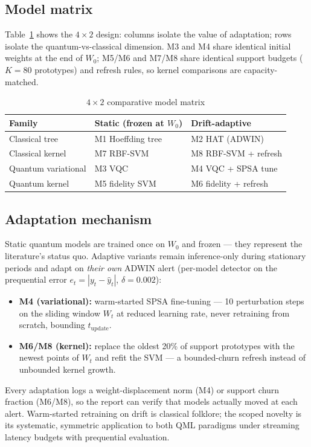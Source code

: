 \documentclass[conference]{IEEEtran}
\begin{document}
\subsection{Model matrix}
Table~\ref{tab:matrix} shows the $4 \times 2$ design: columns isolate the value of
adaptation; rows isolate the quantum-vs-classical dimension. M3 and M4 share identical
initial weights at the end of $W_0$; M5/M6 and M7/M8 share identical support budgets
($K = 80$ prototypes) and refresh rules, so kernel comparisons are capacity-matched.

\begin{table}[t]
\centering
\caption{$4 \times 2$ comparative model matrix}
\label{tab:matrix}
\footnotesize
\setlength{\tabcolsep}{4pt}
\begin{tabular}{@{}lll@{}}
\toprule
Family & Static (frozen at $W_0$) & Drift-adaptive \\
\midrule
Classical tree & M1 Hoeffding tree & M2 HAT (ADWIN) \\
Classical kernel & M7 RBF-SVM & M8 RBF-SVM + refresh \\
Quantum variational & M3 VQC & M4 VQC + SPSA tune \\
Quantum kernel & M5 fidelity SVM & M6 fidelity + refresh \\
\bottomrule
\end{tabular}
\end{table}

\subsection{Adaptation mechanism}
Static quantum models are trained once on $W_0$ and frozen --- they represent the
literature's status quo. Adaptive variants remain inference-only during stationary
periods and adapt on \emph{their own} ADWIN alert (per-model detector on the prequential
error $e_t = |y_t - \hat{y}_t|$, $\delta = 0.002$):
\begin{itemize}
  \item \textbf{M4 (variational):} warm-started SPSA fine-tuning --- 10 perturbation steps
    on the sliding window $W_t$ at reduced learning rate, never retraining from scratch,
    bounding $t_{\text{update}}$.
  \item \textbf{M6/M8 (kernel):} replace the oldest 20\% of support prototypes with the
    newest points of $W_t$ and refit the SVM --- a bounded-churn refresh instead of
    unbounded kernel growth.
\end{itemize}
Every adaptation logs a weight-displacement norm (M4) or support churn fraction (M6/M8),
so the report can verify that models actually moved at each alert. Warm-started retraining
on drift is classical folklore; the scoped novelty is its systematic, symmetric application
to both QML paradigms under streaming latency budgets with prequential evaluation.
\end{document}
